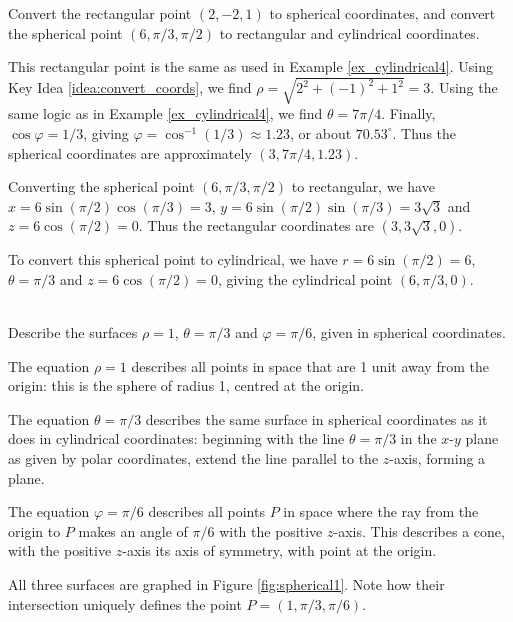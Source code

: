 
{Convert the rectangular point $(2,-2,1)$ to spherical coordinates, and convert the spherical point $(6,\pi/3,\pi/2)$ to rectangular and cylindrical coordinates.
}
{This rectangular point is the same as used in Example \ref{ex_cylindrical4}. Using Key Idea \ref{idea:convert_coords}, we find $\rho = \sqrt{2^2+(-1)^2+1^2} = 3$. Using the same logic as in Example \ref{ex_cylindrical4}, we find $\theta = 7\pi/4$. Finally, $\cos\varphi = 1/3$, giving $\varphi = \cos^{-1}(1/3) \approx 1.23$, or about $70.53^\circ$. Thus the spherical coordinates are approximately $(3,7\pi/4,1.23)$.

Converting the spherical point $(6,\pi/3,\pi/2)$ to rectangular, we have $x = 6\sin(\pi/2)\cos(\pi/3) = 3$, $y = 6\sin(\pi/2)\sin(\pi/3) = 3\sqrt{3}$ and $z = 6\cos(\pi/2) = 0$. Thus the rectangular coordinates are $(3,3\sqrt{3},0)$.

To convert this spherical point to cylindrical, we have $r = 6\sin(\pi/2) = 6$, $\theta = \pi/3$ and $z = 6\cos(\pi/2) =0$, giving the cylindrical point $(6,\pi/3,0)$.
}\\

{Describe the surfaces $\rho=1$, $\theta = \pi/3$ and $\varphi = \pi/6$, given in spherical coordinates.
}
{The equation $\rho = 1$ describes all points in space that are 1 unit away from the origin: this is the sphere of radius 1, centred at the origin.

The equation $\theta = \pi/3$ describes the same surface in spherical coordinates as it does in cylindrical coordinates: beginning with the line $\theta = \pi/3$ in the $x$-$y$ plane as given by polar coordinates, extend the line parallel to the $z$-axis, forming a plane.

The equation $\varphi=\pi/6$ describes all points $P$ in space where the ray from the origin to $P$ makes an angle of $\pi/6$ with the positive $z$-axis. This describes a cone, with the positive $z$-axis its axis of symmetry, with point at the origin.

All three surfaces are graphed in Figure \ref{fig:spherical1}. Note how their intersection uniquely defines the point $P=(1,\pi/3,\pi/6)$.
}\\

